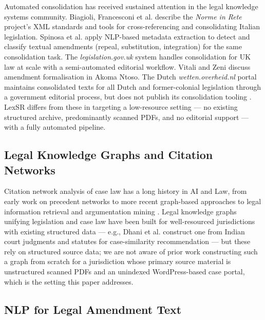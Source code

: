 \documentclass{IOS-Book-Article}
\begin{document}
Automated consolidation has received sustained attention in the legal knowledge systems
community. Biagioli, Francesconi et al. \cite{francesconi2004} describe the \emph{Norme in
Rete} project's XML standards and tools for cross-referencing and consolidating Italian
legislation. Spinosa et al. \cite{spinosa2009} apply NLP-based metadata extraction to detect
and classify textual amendments (repeal, substitution, integration) for the same
consolidation task. The \emph{legislation.gov.uk} system \cite{sheridan2010}
handles consolidation for UK law at scale with a semi-automated editorial workflow. Vitali
and Zeni \cite{vitali2007} discuss amendment formalisation in Akoma Ntoso. The Dutch
\emph{wetten.overheid.nl} portal maintains consolidated texts for all Dutch and former-colonial
legislation through a government editorial process, but does not publish its consolidation
tooling \cite{koop2022}. LexSR differs from these in targeting a low-resource setting --- no
existing structured archive, predominantly scanned PDFs, and no editorial support --- with a
fully automated pipeline.

\subsection{Legal Knowledge Graphs and Citation Networks}

Citation network analysis of case law has a long history in AI and Law, from early work on
precedent networks to more recent graph-based approaches to legal information retrieval and
argumentation mining \cite{benchcapon2012}. Legal knowledge graphs unifying legislation
and case law have been built for well-resourced jurisdictions with existing structured data
--- e.g., Dhani et al. \cite{dhani2021} construct one from Indian court judgments and statutes
for case-similarity recommendation --- but these rely on structured source data; we are
not aware of prior work constructing such a graph from scratch for a jurisdiction whose
primary source material is unstructured scanned PDFs and an unindexed WordPress-based case
portal, which is the setting this paper addresses.

\subsection{NLP for Legal Amendment Text}
\end{document}
